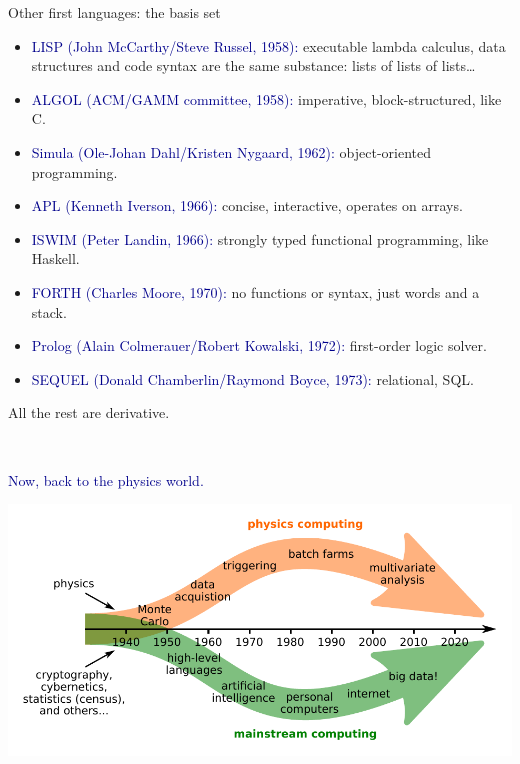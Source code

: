 \documentclass[aspectratio=169]{beamer}
\begin{document}
\begin{frame}{Other first languages: the basis set}
\vspace{0.35 cm}
\begin{itemize}\setlength{\itemsep}{0.3 cm}
\item \textcolor{darkblue}{LISP (John McCarthy/Steve Russel, 1958):} executable lambda calculus, data structures and code syntax are the same substance: lists of lists of lists\ldots

\item \textcolor{darkblue}{ALGOL (ACM/GAMM committee, 1958):} imperative, block-structured, like C.

\item \textcolor{darkblue}{Simula (Ole-Johan Dahl/Kristen Nygaard, 1962):} object-oriented programming.

\item \textcolor{darkblue}{APL (Kenneth Iverson, 1966):} concise, interactive, operates on arrays.

\item \textcolor{darkblue}{ISWIM (Peter Landin, 1966):} strongly typed functional programming, like Haskell.

\item \textcolor{darkblue}{FORTH (Charles Moore, 1970):} no functions or syntax, just words and a stack.

\item \textcolor{darkblue}{Prolog (Alain Colmerauer/Robert Kowalski, 1972):} first-order logic solver.

\item \textcolor{darkblue}{SEQUEL (Donald Chamberlin/Raymond Boyce, 1973):} relational, SQL.
\end{itemize}

\begin{center}
\LARGE
All the rest are derivative.
\end{center}
\end{frame}

\begin{frame}{\mbox{ }}
\vspace{0.5 cm}
\huge
\begin{center}
\textcolor{darkblue}{Now, back to the physics world.}

\vspace{0.5 cm}
\includegraphics[width=0.75\linewidth]{PLOTS/grand-timeline.pdf}
\end{center}
\end{frame}
\end{document}
